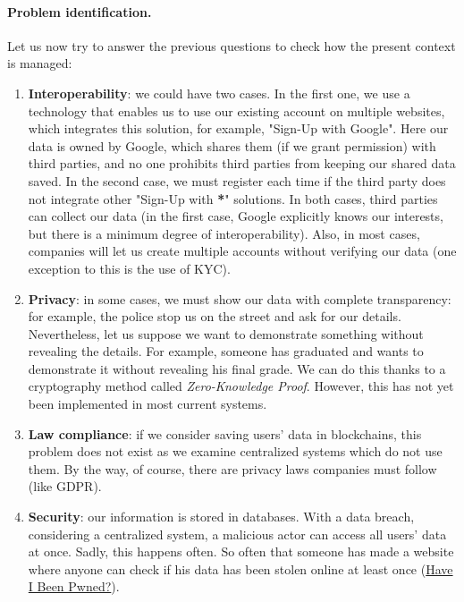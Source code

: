 \paragraph{Problem identification.} Let us now try to answer the previous questions 
to check how the present context is managed:
\begin{enumerate}
    \item \textbf{Interoperability}: we could have two cases. In the first one, 
    we use a technology that enables us to use our existing account on 
    multiple websites, which integrates this solution, for example, "Sign-Up 
    with Google". Here our data is owned by Google, which shares them (if we 
    grant permission) with third parties, and no one prohibits third parties 
    from keeping our shared data saved. In the second case, we must register 
    each time if the third party does not integrate other "Sign-Up with \textbf{*}" 
    solutions. In both cases, third parties can collect our data (in the 
    first case, Google explicitly knows our interests, but there is a minimum
    degree of interoperability). Also, in most cases, companies will let us 
    create multiple accounts without verifying our data (one exception to 
    this is the use of KYC).
    \item \textbf{Privacy}: in some cases, we must show our data
    with complete transparency: for example, the police stop us on the 
    street and ask for our details. Nevertheless, let us suppose we want to 
    demonstrate something without revealing the details. For example, 
    someone has graduated and wants to demonstrate it without revealing 
    his final grade. We can do this thanks to a cryptography method 
    called \textit{Zero-Knowledge Proof}. However, this has not yet been
    implemented in most current systems.
    \item \textbf{Law compliance}: if we consider saving users' data in 
    blockchains, this problem does not exist as we examine centralized 
    systems which do not use them. By the way, of course, there are privacy 
    laws companies must follow (like GDPR).
    \item \textbf{Security}: our information is stored in databases. With 
    a data breach, considering a centralized system, a malicious actor can 
    access all users' data at once. Sadly, this happens often. So often 
    that someone has made a website where anyone can check if his data has 
    been stolen online at least once (\href{https://haveibeenpwned.com/}
    {Have I Been Pwned?}).
\end{enumerate}

